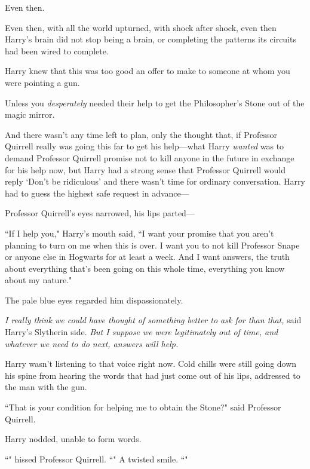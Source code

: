 Even then.

Even then, with all the world upturned, with shock after shock, even then Harry's brain did not stop being a brain, or completing the patterns its circuits had been wired to complete.

Harry knew that this was too good an offer to make to someone at whom you were pointing a gun.

Unless you \emph{desperately} needed their help to get the Philosopher's Stone out of the magic mirror.

And there wasn't any time left to plan, only the thought that, if Professor Quirrell really was going this far to get his help—what Harry \emph{wanted} was to demand Professor Quirrell promise not to kill anyone in the future in exchange for his help now, but Harry had a strong sense that Professor Quirrell would reply `Don't be ridiculous' and there wasn't time for ordinary conversation. Harry had to guess the highest safe request in advance—

Professor Quirrell's eyes narrowed, his lips parted—

``If I help you," Harry's mouth said, ``I want your promise that you aren't planning to turn on me when this is over. I want you to not kill Professor Snape or anyone else in Hogwarts for at least a week. And I want answers, the truth about everything that's been going on this whole time, everything you know about my nature."

The pale blue eyes regarded him dispassionately.

\emph{I really think we could have thought of something better to ask for than that,} said Harry's Slytherin side. \emph{But I suppose we were legitimately out of time, and whatever we need to do next, answers will help.}

Harry wasn't listening to that voice right now. Cold chills were still going down his spine from hearing the words that had just come out of his lips, addressed to the man with the gun.

``That is your condition for helping me to obtain the Stone?" said Professor Quirrell.

Harry nodded, unable to form words.

``" hissed Professor Quirrell. ``" A twisted smile. ``"

